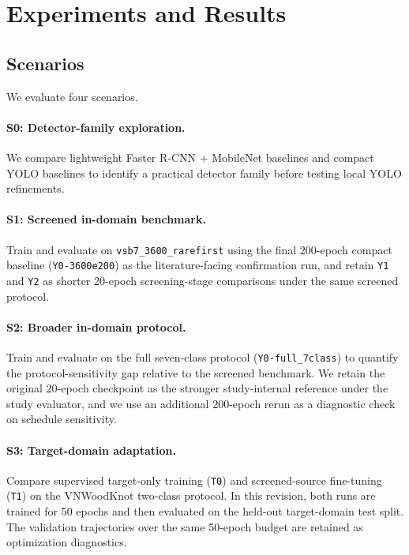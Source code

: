 \section{Experiments and Results}
\label{sec:experiments}

\subsection{Scenarios}

We evaluate four scenarios.

\paragraph{S0: Detector-family exploration.}
We compare lightweight Faster R-CNN + MobileNet baselines and compact YOLO baselines to identify a practical detector family before testing local YOLO refinements.

\paragraph{S1: Screened in-domain benchmark.}
Train and evaluate on \texttt{vsb7\_3600\_rarefirst} using the final 200-epoch compact baseline (\texttt{Y0-3600e200}) as the literature-facing confirmation run, and retain \texttt{Y1} and \texttt{Y2} as shorter 20-epoch screening-stage comparisons under the same screened protocol.

\paragraph{S2: Broader in-domain protocol.}
Train and evaluate on the full seven-class protocol (\texttt{Y0-full\_7class}) to quantify the protocol-sensitivity gap relative to the screened benchmark. We retain the original 20-epoch checkpoint as the stronger study-internal reference under the study evaluator, and we use an additional 200-epoch rerun as a diagnostic check on schedule sensitivity.

\paragraph{S3: Target-domain adaptation.}
Compare supervised target-only training (\texttt{T0}) and screened-source fine-tuning (\texttt{T1}) on the VNWoodKnot two-class protocol. In this revision, both runs are trained for 50 epochs and then evaluated on the held-out target-domain test split. The validation trajectories over the same 50-epoch budget are retained as optimization diagnostics.

